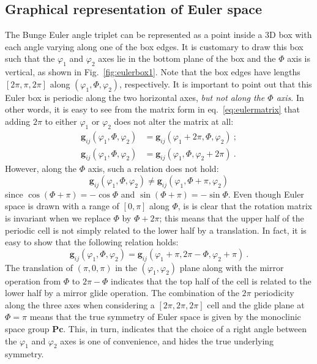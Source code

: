 \subsection{Graphical representation of Euler space\label{sec:eulerspace}}
The Bunge Euler angle triplet can be represented as a point inside a 3D box with each angle varying along one of the box edges. It is customary to draw this box such that the $\varphi_1$ and $\varphi_2$ axes lie in the bottom plane of the box and the $\Phi$ axis is vertical, as shown in Fig.~\ref{fig:eulerbox1}. Note that the box edges have lengths $[2\pi, \pi, 2\pi]$ along $(\varphi_1,\Phi,\varphi_2)$, respectively.  It is important to point out that this Euler box is periodic along the two horizontal axes, \textit{but not along the $\Phi$ axis}.  In other words, it is easy to see from the matrix form in eq.~\ref{eq:eulermatrix} that adding $2\pi$ to either $\varphi_1$ or $\varphi_2$ does not alter the matrix at all:
\begin{align*}
	\mathbf{g}_{ij}(\varphi_1,\Phi,\varphi_2) &=\mathbf{g}_{ij}(\varphi_1+2\pi,\Phi,\varphi_2)\ ;\\
	\mathbf{g}_{ij}(\varphi_1,\Phi,\varphi_2) &=\mathbf{g}_{ij}(\varphi_1,\Phi,\varphi_2+2\pi)\ .
\end{align*}
However, along the $\Phi$ axis, such a relation does not hold:
\[
	\mathbf{g}_{ij}(\varphi_1,\Phi,\varphi_2) \ne \mathbf{g}_{ij}(\varphi_1,\Phi+\pi,\varphi_2)
\]
since $\cos(\Phi+\pi)=-\cos\Phi$ and $\sin(\Phi+\pi)=-\sin\Phi$.  Even though Euler space is drawn with a range of $[0,\pi]$ along $\Phi$, is is clear that the rotation matrix is invariant when we replace $\Phi$ by $\Phi+2\pi$; this means that the upper half of the periodic cell is not simply related to the lower half by a translation.  In fact, it is easy to show that the following relation holds:
\begin{equation}
	\mathbf{g}_{ij}(\varphi_1,\Phi,\varphi_2) = \mathbf{g}_{ij}(\varphi_1+\pi,2\pi-\Phi,\varphi_2+\pi)\ .\label{eq:eulerglide}
\end{equation}
The translation of $(\pi,0,\pi)$ in the $(\varphi_1,\varphi_2)$ plane along with the mirror operation from $\Phi$ to $2\pi-\Phi$ indicates that the top half of the cell is related to the lower half by a mirror glide operation. The combination of the $2\pi$ periodicity along the three axes when considering a $[2\pi,2\pi,2\pi]$ cell and the glide plane at $\Phi=\pi$ means that the true symmetry of Euler space is given by the monoclinic space group $\mathbf{Pc}$.   This, in turn, indicates that the choice of a right angle between the $\varphi_1$ and $\varphi_2$ axes is one of convenience, and hides the true underlying symmetry.

